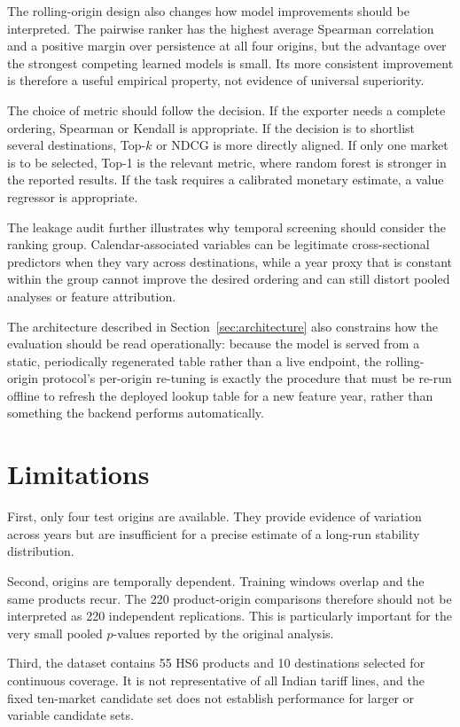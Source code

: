 \documentclass[conference]{IEEEtran}
\begin{document}
The rolling-origin design also changes how model improvements should be interpreted. The pairwise ranker has the highest average Spearman correlation and a positive margin over persistence at all four origins, but the advantage over the strongest competing learned models is small. Its more consistent improvement is therefore a useful empirical property, not evidence of universal superiority.

The choice of metric should follow the decision. If the exporter needs a complete ordering, Spearman or Kendall is appropriate. If the decision is to shortlist several destinations, Top-$k$ or NDCG is more directly aligned. If only one market is to be selected, Top-1 is the relevant metric, where random forest is stronger in the reported results. If the task requires a calibrated monetary estimate, a value regressor is appropriate.

The leakage audit further illustrates why temporal screening should consider the ranking group. Calendar-associated variables can be legitimate cross-sectional predictors when they vary across destinations, while a year proxy that is constant within the group cannot improve the desired ordering and can still distort pooled analyses or feature attribution.

The architecture described in Section~\ref{sec:architecture} also constrains how the evaluation should be read operationally: because the model is served from a static, periodically regenerated table rather than a live endpoint, the rolling-origin protocol's per-origin re-tuning is exactly the procedure that must be re-run offline to refresh the deployed lookup table for a new feature year, rather than something the backend performs automatically.

\section{Limitations}

First, only four test origins are available. They provide evidence of variation across years but are insufficient for a precise estimate of a long-run stability distribution.

Second, origins are temporally dependent. Training windows overlap and the same products recur. The 220 product-origin comparisons therefore should not be interpreted as 220 independent replications. This is particularly important for the very small pooled $p$-values reported by the original analysis.

Third, the dataset contains 55 HS6 products and 10 destinations selected for continuous coverage. It is not representative of all Indian tariff lines, and the fixed ten-market candidate set does not establish performance for larger or variable candidate sets.
\end{document}
